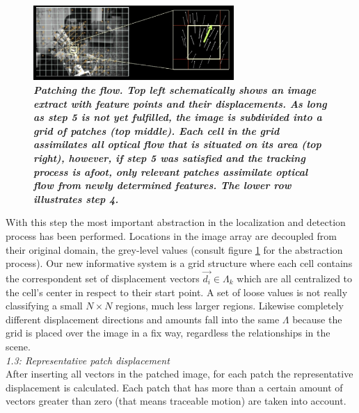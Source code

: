 \begin{figure}
	\begin{center}
		\includegraphics[width=3in]{imgs/method/step1to4.ps}
		\caption[Patching the flow. ]{\textbf{\textit{Patching the flow. Top left schematically shows an image extract with feature points and their displacements. As long as step 5 is not yet fulfilled, the image is subdivided into a grid of patches (top middle). Each cell in the grid assimilates all optical flow that is situated on its area (top right), however, if step 5 was satisfied and the tracking process is afoot, only relevant patches assimilate optical flow from newly determined features. The lower row illustrates step 4. }}}
		\label{fig:abstraction}
	\end{center}
\end{figure}
%
With this step the most important abstraction in the localization and detection process has been performed. Locations in the image array are decoupled from their original domain, the grey-level values (consult figure \ref{fig:abstraction} for the abstraction process). Our new informative system is a grid structure where each cell contains the correspondent set of displacement vectors $ \vec{d_i} \in \Lambda_k $ which are all centralized to the cell's center in respect to their start point. A set of loose values is not really classifying a small $ N \times N $ regions, much less larger regions. Likewise completely different displacement directions and amounts fall into the same $ \Lambda $ because the grid is placed over the image in a fix way, regardless the relationships in the scene.\\ \newline
%
\textit{1.3: Representative patch displacement} \\ \newline
After inserting all vectors in the patched image, for each patch the representative displacement is calculated. Each patch that has more than a certain amount of vectors greater than zero (that means traceable motion) are taken into account.
